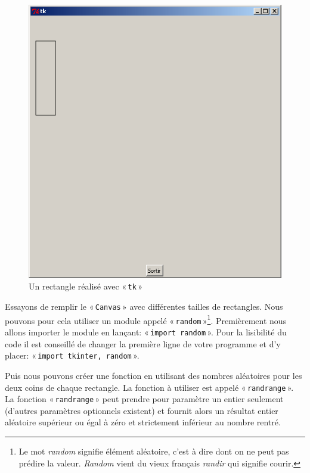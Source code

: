\begin{figure}[h!]
\centering
\includegraphics[scale=0.4]{images/rectangle}
\caption{Un rectangle réalisé avec « \texttt{tk} »}\label{fig:rectangle}
\end{figure}
 
Essayons de remplir le « \texttt{Canvas} » avec différentes tailles de rectangles. Nous pouvons pour cela utiliser un module appelé « \texttt{random} »\footnote{Le mot \emph{random} signifie élément aléatoire, c'est à dire dont on ne peut pas prédire la valeur. \emph{Random} vient du vieux français \emph{randir} qui signifie courir.}. Premièrement nous allons importer le module en lançant: « \texttt{import random} ». Pour la lisibilité du code il est conseillé de changer la première ligne de votre programme et d'y placer: « \texttt{import tkinter, random} ».

Puis  nous pouvons créer une fonction en utilisant des nombres aléatoires pour les deux coins de chaque rectangle. La fonction à utiliser est appelé « \texttt{randrange} ». La fonction « \texttt{randrange} » peut prendre pour paramètre un entier seulement (d'autres paramètres optionnels existent) et fournit alors un résultat entier aléatoire supérieur ou égal à zéro et strictement inférieur au nombre rentré.

